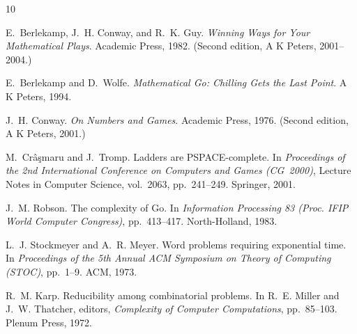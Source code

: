 \documentclass[11pt,a4paper]{amsart}
\theoremstyle{definition}
\theoremstyle{remark}
\begin{document}
\begin{thebibliography}{10}

E.~Berlekamp, J.~H. Conway, and R.~K. Guy.
\newblock \emph{Winning Ways for Your Mathematical Plays}.
\newblock Academic Press, 1982. (Second edition, A K Peters, 2001--2004.)

E.~Berlekamp and D.~Wolfe.
\newblock \emph{Mathematical Go: Chilling Gets the Last Point}.
\newblock A K Peters, 1994.

J.~H. Conway.
\newblock \emph{On Numbers and Games}.
\newblock Academic Press, 1976. (Second edition, A K Peters, 2001.)

M.~Cr\^{a}\c{s}maru and J.~Tromp.
\newblock Ladders are {PSPACE}-complete.
\newblock In \emph{Proceedings of the 2nd International Conference on Computers
  and Games (CG~2000)}, Lecture Notes in Computer Science, vol.~2063,
  pp.~241--249. Springer, 2001.

J.~M. Robson.
\newblock The complexity of {G}o.
\newblock In \emph{Information Processing 83 (Proc. IFIP World Computer
  Congress)}, pp.~413--417. North-Holland, 1983.

L.~J. Stockmeyer and A.~R. Meyer.
\newblock Word problems requiring exponential time.
\newblock In \emph{Proceedings of the 5th Annual ACM Symposium on Theory of
  Computing (STOC)}, pp.~1--9. ACM, 1973.

R.~M. Karp.
\newblock Reducibility among combinatorial problems.
\newblock In R.~E. Miller and J.~W. Thatcher, editors, \emph{Complexity of
  Computer Computations}, pp.~85--103. Plenum Press, 1972.

\end{thebibliography}
\end{document}
